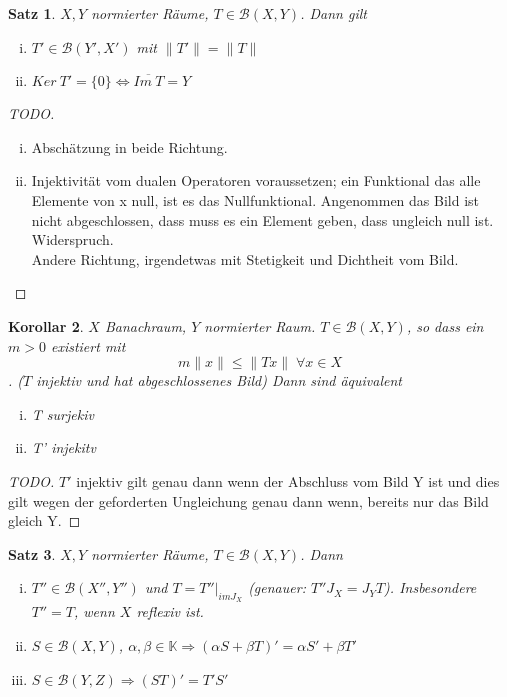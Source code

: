 \documentclass[ngerman]{report}
\theoremstyle{plain}%
\newtheorem{thm}{Satz}[chapter]
\newtheorem{cor}[thm]{Korollar}
\theoremstyle{definition}%
\theoremstyle{myStyle}
\newcommand{\K}{\mathbb{K}}
\newcommand{\B}{\mathcal{B}} %
\newcommand{\BS}[1][X,Y]{\mathcal{B}(#1)} %
\newcommand{\norm}[1]{\|#1\|}
\newcommand{\df}[1][]{%
	\overset{#1}{\Rightarrow}
}
\newcommand{\aq}{\Leftrightarrow} %
\newcommand{\set}[1]{\{#1\}}
\begin{document}
	\begin{thm}
		$X, Y$ normierter Räume, $T\in \BS$. Dann gilt 
			\begin{enumerate}[(i)]
				\item $T' \in \B(Y', X')$ mit $\norm{T'} = \norm{T}$
				\item $Ker\: T' = \set{0} \aq \overline{Im\: T} = Y$
			\end{enumerate}
	\end{thm}

	\begin{proof}[TODO]
		\begin{enumerate}[(i)]
			\item Abschätzung in beide Richtung.
			\item Injektivität vom dualen Operatoren voraussetzen; ein Funktional das alle Elemente von x null, ist es das Nullfunktional. Angenommen das Bild ist nicht abgeschlossen, dass muss es ein Element geben, dass ungleich null ist. Widerspruch. \\
			Andere Richtung, irgendetwas mit Stetigkeit und Dichtheit vom Bild.
		\end{enumerate}
	\end{proof}

	\begin{cor}
		$X$ Banachraum, $Y$ normierter Raum. $T\in \BS$, so dass ein $m > 0$ existiert mit 
			$$m \norm{x} \leq \norm{Tx} \; \forall x \in X$$. ($T$ injektiv und hat abgeschlossenes Bild)
			Dann sind äquivalent 
						\begin{enumerate}[(i)]
							\item T surjekiv
							\item T' injekitv
						\end{enumerate}
	\end{cor}

	\begin{proof}[TODO]
		$T'$ injektiv gilt genau dann wenn der Abschluss vom Bild Y ist und dies gilt wegen der geforderten Ungleichung genau dann wenn, bereits nur das Bild gleich Y.
	\end{proof}

	\begin{thm}
		$X, Y$ normierter Räume, $T\in \BS$. Dann
				\begin{enumerate}[(i)]
					\item $T'' \in \B(X'',Y'')$ und $T = T''|_{imJ_X}$ (genauer: $T''J_X = J_Y T$). Insbesondere $T'' = T$, wenn $X$ reflexiv ist.
					\item $S\in \BS$, $\alpha, \beta \in \K \df (\alpha S + \beta T)' = \alpha S' + \beta T'$
					\item $S\in \B(Y,Z) \df (ST)' = T' S'$
				\end{enumerate}

	\end{thm}
\end{document}
